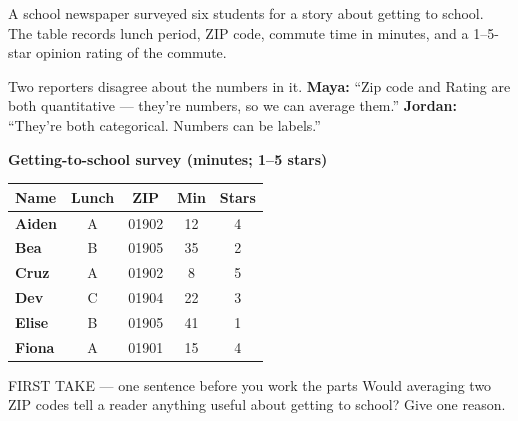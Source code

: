 \documentclass[11pt]{article}
\begin{document}

\clearpage
{}

A school newspaper surveyed six students for a story about getting to school. The table records lunch period, ZIP code, commute time in minutes, and a 1--5-star opinion rating of the commute.\par\smallskip Two reporters disagree about the numbers in it. \textbf{Maya:} ``Zip code and Rating are both quantitative --- they're numbers, so we can average them.'' \textbf{Jordan:} ``They're both categorical. Numbers can be labels.''\par
\begin{center}
\textbf{Getting-to-school survey (minutes; 1--5 stars)}\par\smallskip
\begin{tabular}{|l|c|c|c|c|}
\hline
\textbf{Name} & \textbf{Lunch} & \textbf{ZIP} & \textbf{Min} & \textbf{Stars} \\ \hline
\textbf{Aiden} & A & 01902 & 12 & 4 \\ \hline
\textbf{Bea} & B & 01905 & 35 & 2 \\ \hline
\textbf{Cruz} & A & 01902 & 8 & 5 \\ \hline
\textbf{Dev} & C & 01904 & 22 & 3 \\ \hline
\textbf{Elise} & B & 01905 & 41 & 1 \\ \hline
\textbf{Fiona} & A & 01901 & 15 & 4 \\ \hline
\end{tabular}
\end{center}
\begin{firsttakebox}{FIRST TAKE --- one sentence before you work the parts}
Would averaging two ZIP codes tell a reader anything useful about getting to school? Give one reason.\par
{}
\end{firsttakebox}
\end{document}
